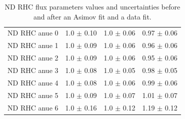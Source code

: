 \begin{table}[ht!]
\begin{tabular}{llll}
    \Gls{ND} \Gls{RHC} \Gls{anue} 0& 1.0 $\pm$ 0.10 & 1.0 $\pm$ 0.06 & 0.97 $\pm$ 0.06 \\ 
    \Gls{ND} \Gls{RHC} \Gls{anue} 1& 1.0 $\pm$ 0.09 & 1.0 $\pm$ 0.06 & 0.96 $\pm$ 0.06 \\ 
    \Gls{ND} \Gls{RHC} \Gls{anue} 2& 1.0 $\pm$ 0.09 & 1.0 $\pm$ 0.06 & 0.95 $\pm$ 0.06 \\ 
    \Gls{ND} \Gls{RHC} \Gls{anue} 3& 1.0 $\pm$ 0.08 & 1.0 $\pm$ 0.05 & 0.98 $\pm$ 0.05 \\ 
    \Gls{ND} \Gls{RHC} \Gls{anue} 4& 1.0 $\pm$ 0.08 & 1.0 $\pm$ 0.06 & 0.99 $\pm$ 0.06 \\ 
    \Gls{ND} \Gls{RHC} \Gls{anue} 5& 1.0 $\pm$ 0.09 & 1.0 $\pm$ 0.07 & 1.01 $\pm$ 0.07 \\ 
    \Gls{ND} \Gls{RHC} \Gls{anue} 6& 1.0 $\pm$ 0.16 & 1.0 $\pm$ 0.12 & 1.19 $\pm$ 0.12 \\ \bottomrule
  \end{tabular}
  \caption{\Gls{ND} \Gls{RHC} flux parameters values and uncertainties
    before and after an \Gls{Asimov} fit and a data fit.}
\end{table}
